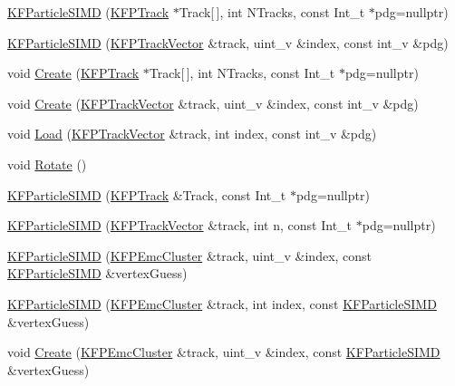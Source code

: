 \begin{DoxyCompactItemize}
\item 
\hyperlink{classKFParticleSIMD_a9bf7805842574b7e7369ab7b8a3c5cf5}{K\+F\+Particle\+S\+I\+MD} (\hyperlink{classKFPTrack}{K\+F\+P\+Track} $\ast$Track\mbox{[}$\,$\mbox{]}, int N\+Tracks, const Int\+\_\+t $\ast$pdg=nullptr)
\item 
\hyperlink{classKFParticleSIMD_a3c406a7f0392416ab800ed99a7d00a40}{K\+F\+Particle\+S\+I\+MD} (\hyperlink{classKFPTrackVector}{K\+F\+P\+Track\+Vector} \&track, uint\+\_\+v \&index, const int\+\_\+v \&pdg)
\item 
void \hyperlink{classKFParticleSIMD_aafceb974b48b230e42424c95e18a612f}{Create} (\hyperlink{classKFPTrack}{K\+F\+P\+Track} $\ast$Track\mbox{[}$\,$\mbox{]}, int N\+Tracks, const Int\+\_\+t $\ast$pdg=nullptr)
\item 
void \hyperlink{classKFParticleSIMD_ac61bb76736c796c2e47da8ad25b81c27}{Create} (\hyperlink{classKFPTrackVector}{K\+F\+P\+Track\+Vector} \&track, uint\+\_\+v \&index, const int\+\_\+v \&pdg)
\item 
void \hyperlink{classKFParticleSIMD_a0e3c7a0202a62c3c564b22b5d0bfce5e}{Load} (\hyperlink{classKFPTrackVector}{K\+F\+P\+Track\+Vector} \&track, int index, const int\+\_\+v \&pdg)
\item 
void \hyperlink{classKFParticleSIMD_aff00da015d04b572823e5006c3d50eed}{Rotate} ()
\item 
\hyperlink{classKFParticleSIMD_aa9c26d3093382318df37c62badd5567a}{K\+F\+Particle\+S\+I\+MD} (\hyperlink{classKFPTrack}{K\+F\+P\+Track} \&Track, const Int\+\_\+t $\ast$pdg=nullptr)
\item 
\hyperlink{classKFParticleSIMD_aed385589f4efbc4290e69f31f1bb01ec}{K\+F\+Particle\+S\+I\+MD} (\hyperlink{classKFPTrackVector}{K\+F\+P\+Track\+Vector} \&track, int n, const Int\+\_\+t $\ast$pdg=nullptr)
\item 
\hyperlink{classKFParticleSIMD_a6718f90ea49c4cceb12809ea80560856}{K\+F\+Particle\+S\+I\+MD} (\hyperlink{classKFPEmcCluster}{K\+F\+P\+Emc\+Cluster} \&track, uint\+\_\+v \&index, const \hyperlink{classKFParticleSIMD}{K\+F\+Particle\+S\+I\+MD} \&vertex\+Guess)
\item 
\hyperlink{classKFParticleSIMD_abd29270d15669591aa6c763f50b6d63c}{K\+F\+Particle\+S\+I\+MD} (\hyperlink{classKFPEmcCluster}{K\+F\+P\+Emc\+Cluster} \&track, int index, const \hyperlink{classKFParticleSIMD}{K\+F\+Particle\+S\+I\+MD} \&vertex\+Guess)
\item 
void \hyperlink{classKFParticleSIMD_af6012e3bf2cac173cbea677204cdc654}{Create} (\hyperlink{classKFPEmcCluster}{K\+F\+P\+Emc\+Cluster} \&track, uint\+\_\+v \&index, const \hyperlink{classKFParticleSIMD}{K\+F\+Particle\+S\+I\+MD} \&vertex\+Guess)

\end{DoxyCompactItemize}
